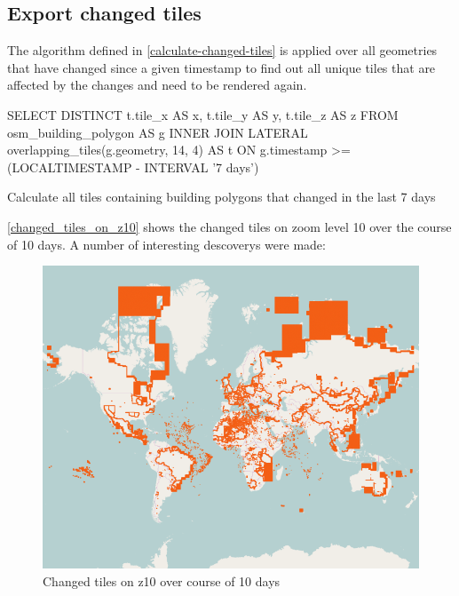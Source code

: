 \subsection*{Export changed tiles}

The algorithm defined in \autoref{calculate-changed-tiles} is applied over all geometries that have changed since a given timestamp to find out all unique tiles that are affected by the changes and need to be rendered again.

\begin{listing}[H]
  \centering
  \begin{sqlcode}
    SELECT DISTINCT t.tile_x AS x, t.tile_y AS y, t.tile_z AS z
    FROM osm_building_polygon AS g
    INNER JOIN LATERAL overlapping_tiles(g.geometry, 14, 4) AS t
    ON g.timestamp >= (LOCALTIMESTAMP - INTERVAL '7 days')
  \end{sqlcode}
  \caption{Calculate all tiles containing building polygons that changed in the last 7 days}
\end{listing}

\autoref{changed_tiles_on_z10} shows the changed tiles on zoom level 10 over the course of 10 days. A number of interesting descoverys were made:

\begin{figure}[H]
  \centering
  \includegraphics[width=1\textwidth]{images/changed_tiles_z10}
  \caption{Changed tiles on z10 over course of 10 days}
  \label{changed_tiles_on_z10}
\end{figure}

